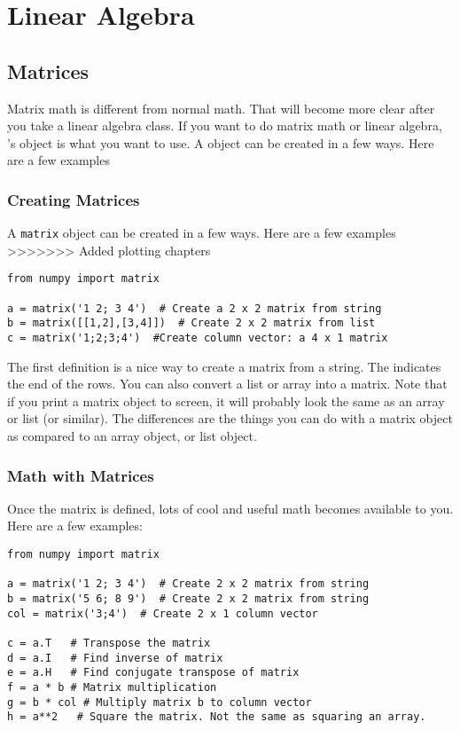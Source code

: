 \chapter{Linear Algebra}
\label{chap:linalg}
\section{Matrices}
Matrix math is different from normal math.  That will become more
clear after you take a linear algebra class.  If you want to do matrix
math or linear algebra, 's  object is what you
want to use.  A  object can be created in a few ways.  Here are
a few examples

\subsection*{Creating Matrices}
A \texttt{matrix} object can be created in a
few ways.  Here are a few examples
>>>>>>> Added plotting chapters
\begin{Verbatim}
from numpy import matrix

a = matrix('1 2; 3 4')  # Create a 2 x 2 matrix from string
b = matrix([[1,2],[3,4]])  # Create 2 x 2 matrix from list
c = matrix('1;2;3;4')  #Create column vector: a 4 x 1 matrix
\end{Verbatim}
The first definition is a nice way to create a matrix from a string.
The \code{;} indicates the end of the rows.  You can also convert a
list or array into a matrix.  Note that if you print a matrix object
to screen, it will probably look the same as an array or list (or
similar).  The differences are the things you can do with a matrix
object as compared to an array object, or list object.

\subsection*{Math with Matrices}
Once the matrix is defined, lots of cool and useful math becomes
available to you.  Here are a few examples:

\begin{Verbatim}
from numpy import matrix

a = matrix('1 2; 3 4')  # Create 2 x 2 matrix from string
b = matrix('5 6; 8 9')  # Create 2 x 2 matrix from string
col = matrix('3;4')  # Create 2 x 1 column vector

c = a.T   # Transpose the matrix
d = a.I   # Find inverse of matrix
e = a.H   # Find conjugate transpose of matrix
f = a * b # Matrix multiplication
g = b * col # Multiply matrix b to column vector
h = a**2   # Square the matrix. Not the same as squaring an array.
\end{Verbatim}
